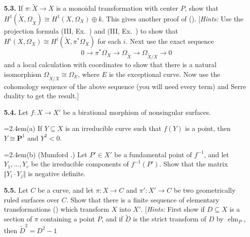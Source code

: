 {\smallskip
\noindent\hypertarget{ex-V-5.3}{}\textbf{5.3.} If $\pi\colon\widetilde X\to X$ is a monoidal transformation with center $P$, show that $H^1(\widetilde X,\Omega_{\widetilde X})\cong H^1(X,\Omega_X)\oplus k$. This gives another proof of (). [\emph{Hints:} Use the projection formula (III, Ex.~) and (III, Ex.~) to show that $H^i(X,\Omega_X)\cong H^i(\widetilde X,\pi^*\Omega_X)$ for each $i$. Next use the exact sequence
\[
0\to\pi^*\Omega_X\to\Omega_{\widetilde X}\to\Omega_{\widetilde X/X}\to0
\]
and a local calculation with coordinates to show that there is a natural isomorphism $\Omega_{\widetilde X/X}\cong\Omega_E$, where $E$ is the exceptional curve. Now use the cohomology sequence of the above sequence (you will need every term) and Serre duality to get the result.]

\smallskip
\noindent\hypertarget{ex-V-5.4}{}\textbf{5.4.} Let $f\colon X\to X'$ be a birational morphism of nonsingular surfaces.

\noindent\hangindent=2.4em\hspace*{1.15em}(a) If $Y\subseteq X$ is an irreducible curve such that $f(Y)$ is a point, then $Y\cong\mathbf P^1$ and $Y^2<0$.

\noindent\hangindent=2.4em\hspace*{1.15em}(b) (Mumford .) Let $P'\in X'$ be a fundamental point of $f^{-1}$, and let $Y_1,\dots,Y_r$ be the irreducible components of $f^{-1}(P')$. Show that the matrix $\Vert Y_i\cdot Y_j\Vert$ is negative definite.

\smallskip
\noindent\hypertarget{ex-V-5.5}{}\textbf{5.5.} Let $C$ be a curve, and let $\pi\colon X\to C$ and $\pi'\colon X'\to C$ be two geometrically ruled surfaces over $C$. Show that there is a finite sequence of elementary transformations () which transform $X$ into $X'$. [\emph{Hints:} First show if $D\subseteq X$ is a section of $\pi$ containing a point $P$, and if $\widetilde D$ is the strict transform of $D$ by $\operatorname{elm}_P$, then $\widetilde D^2=D^2-1$}
